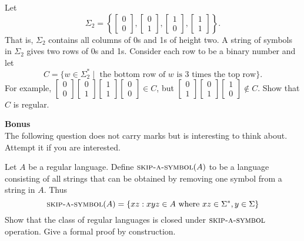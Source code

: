 \documentclass[addpoints]{exam}
\begin{document}
\begin{questions}
\question[10] Let
  \[
    \Sigma_2 = \left\{ \begin{bmatrix} 0\\0 \end{bmatrix}, \begin{bmatrix} 0\\1 \end{bmatrix}, \begin{bmatrix} 1\\0 \end{bmatrix}, \begin{bmatrix} 1\\1 \end{bmatrix} \right\}.
  \]
  That is, $\Sigma_2$ contains all columns of 0s and 1s of height two. A string of symbols in $\Sigma_2$ gives two rows of 0s and 1s. Consider each row to be a binary number and let
  \[
    C = \{ w\in\Sigma_2^* \mid \text{ the bottom row of }w \text{ is 3 times the top row} \}.
  \]
  For example, $\begin{bmatrix} 0\\0 \end{bmatrix} \begin{bmatrix} 0\\1 \end{bmatrix} \begin{bmatrix} 1\\1 \end{bmatrix} \begin{bmatrix} 0\\0 \end{bmatrix} \in C$, but  $\begin{bmatrix} 0\\1 \end{bmatrix} \begin{bmatrix} 0\\1 \end{bmatrix} \begin{bmatrix} 1\\0 \end{bmatrix} \not\in C$. Show that $C$ is regular.

  
  \begin{EnvFullwidth}
    {\large\bf Bonus}\\
    The following question does not carry marks but is interesting to think about. Attempt it if you are interested.
  \end{EnvFullwidth}

\question[0] Let $A$ be a regular language. Define $\text{\textsc{skip-a-symbol}}(A)$ to be a language consisting of all strings that can be obtained by removing one symbol from a string in $A$. Thus 
  \[
    \text{\textsc{skip-a-symbol}}(A) =  \{ xz : xyz \in  A \text{ where } xz \in \Sigma^*, y \in \Sigma\}
  \]
  Show that the class of regular languages is closed under $\text{\textsc{skip-a-symbol}}$ operation. Give a formal proof by construction. 
  
\end{questions}
\end{document}
